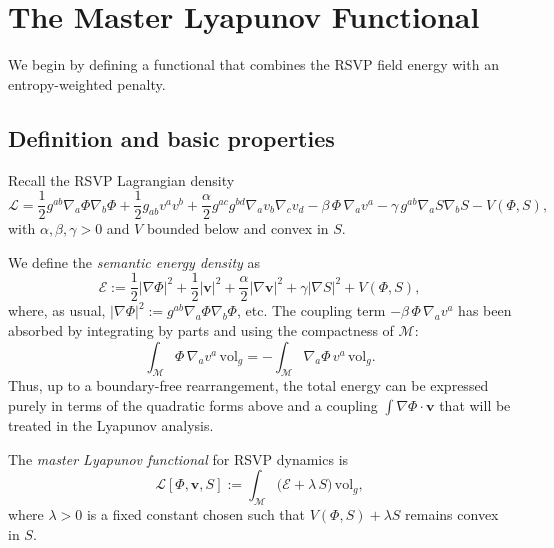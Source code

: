 \section{The Master Lyapunov Functional}

We begin by defining a functional that combines the RSVP field energy with an
entropy-weighted penalty.

\subsection{Definition and basic properties}

Recall the RSVP Lagrangian density
\begin{equation}
\label{eq:rsvp-lagrangian-ch3}
\mathcal{L}
= \frac{1}{2} g^{ab} \nabla_a \Phi \nabla_b \Phi
  + \frac{1}{2} g_{ab} v^a v^b
  + \frac{\alpha}{2} g^{ac} g^{bd} \nabla_a v_b \nabla_c v_d
  - \beta\, \Phi\, \nabla_a v^a
  - \gamma\, g^{ab} \nabla_a S \nabla_b S
  - V(\Phi,S),
\end{equation}
with $\alpha,\beta,\gamma > 0$ and $V$ bounded below and convex in $S$.

We define the \emph{semantic energy density} as
\begin{equation}
\label{eq:semantic-energy-density}
\mathcal{E}
:= \frac{1}{2} |\nabla\Phi|^2
 + \frac{1}{2} |\mathbf{v}|^2
 + \frac{\alpha}{2} |\nabla \mathbf{v}|^2
 + \gamma |\nabla S|^2
 + V(\Phi,S),
\end{equation}
where, as usual,
$|\nabla\Phi|^2 := g^{ab}\nabla_a\Phi\nabla_b\Phi$, etc.
The coupling term $-\beta\,\Phi\,\nabla_a v^a$ has been absorbed by integrating
by parts and using the compactness of $\mathcal{M}$:
\[
\int_{\mathcal{M}} \Phi\, \nabla_a v^a\, \mathrm{vol}_g 
= - \int_{\mathcal{M}} \nabla_a \Phi \, v^a \, \mathrm{vol}_g.
\]
Thus, up to a boundary-free rearrangement, the total energy can be expressed
purely in terms of the quadratic forms above and a coupling
$\int \nabla\Phi\cdot \mathbf{v}$ that will be treated in the Lyapunov analysis.

\begin{definition}
\label{def:master-lyapunov}
The \emph{master Lyapunov functional} for RSVP dynamics is
\begin{equation}
\label{eq:master-lyapunov}
\mathscr{L}[\Phi,\mathbf{v},S]
:= \int_{\mathcal{M}}
\Big(
  \mathcal{E}
  + \lambda\, S
\Big)\,\mathrm{vol}_g,
\end{equation}
where $\lambda > 0$ is a fixed constant chosen such that $V(\Phi,S)+\lambda S$
remains convex in $S$.
\end{definition}

